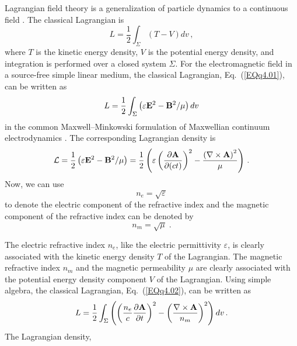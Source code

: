 \documentclass[twocolumn,amssymb,eqsecnum,aps,pra]{revtex4-2}
\begin{document}
\par
Lagrangian field theory is a generalization of particle dynamics to a
continuous field \cite{BIGold,BICohen}.
The classical Lagrangian is 
\begin{equation}
L=\frac{1}{2} \int_{\Sigma} (T-V) dv \, ,
\label{EQq4.01}
\end{equation}
where $T$ is the kinetic energy density, $V$ is the potential energy
density, and integration is performed over a closed system $\Sigma$.
For the electromagnetic field in a source-free simple linear medium,
the classical Lagrangian, Eq.~(\ref{EQq4.01}), can be written as
\begin{equation}
L=\frac{1}{2}\int_{\Sigma}
\left ({\varepsilon}{\bf E}^2-{\bf B}^2/\mu\right )dv
\label{EQq4.02}
\end{equation}
in the common Maxwell--Minkowski formulation of Maxwellian continuum
electrodynamics \cite{BIGold,BICohen,BIJackson,BIZangwill}.
The corresponding Lagrangian density is
\begin{equation}
{\cal L}=\frac{1}{2}
\left ({\varepsilon}{\bf E}^2-{\bf B}^2/\mu\right )
=\frac{1}{2} \left (
\varepsilon\left (
\frac{\partial{\bf A}}{\partial (ct)}
\right )^2
- \frac{ \left (\nabla\times{\bf A} \right )^2 }{\mu} 
\right )\, .
\label{EQq4.03}
\end{equation}
Now, we can use \cite{BINewFres,BIIdentity}
\begin{equation}
n_e=\sqrt{\varepsilon}
\label{EQq4.04}
\end{equation}
to denote the electric component of the refractive index and the
magnetic component of the refractive index can be denoted by
\begin{equation}
n_m=\sqrt{\mu} \; .
\label{EQq4.05}
\end{equation}
\par
The electric refractive index $n_e$, like the electric permittivity
$\varepsilon$, is clearly associated with the kinetic energy density
$T$ of the Lagrangian.
The magnetic refractive index $n_m$ and the magnetic permeability $\mu$ 
are clearly associated with the potential energy density component $V$
of the Lagrangian.
Using simple algebra, the classical Lagrangian, Eq.~(\ref{EQq4.02}),
can be written as
\begin{equation}
L=\frac{1}{2} \int_{\Sigma} \left (
\left (
\frac{n_e}{c}\frac{\partial{\bf A}}{\partial t}
\right )^2
- \left (\frac{\nabla\times{\bf A}}{n_m} \right )^2
\right ) dv \, .
\label{EQq4.06}
\end{equation}
The Lagrangian density,
\end{document}
